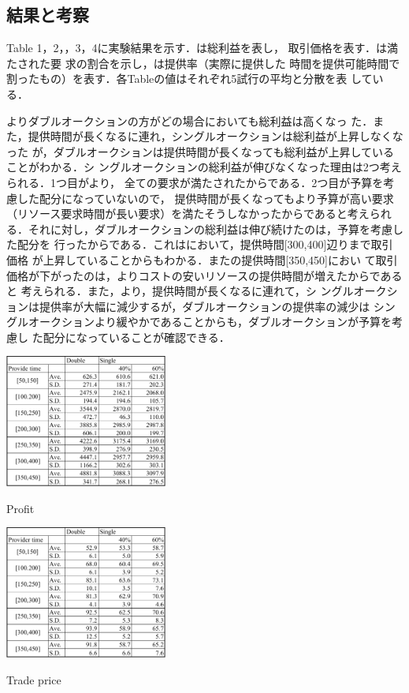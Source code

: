 \documentclass{ujarticle}
\begin{document}
\subsection{結果と考察}
Table 1，2，，3，4に実験結果を示す．は総利益を表し，
取引価格を表す．は満たされた要
求の割合を示し，は提供率（実際に提供した
時間を提供可能時間で割ったもの）を表す．各Tableの値はそれぞれ5試行の平均と分散を表
している．\par
{}よりダブルオークションの方がどの場合においても総利益は高くなっ
た．また，提供時間が長くなるに連れ，シングルオークションは総利益が上昇しなくなった
が，ダブルオークションは提供時間が長くなっても総利益が上昇していることがわかる．シ
ングルオークションの総利益が伸びなくなった理由は2つ考えられる．1つ目がより，
全ての要求が満たされたからである．2つ目が予算を考慮した配分になっていないので，
提供時間が長くなってもより予算が高い要求（リソース要求時間が長い要求）を満たそうしなかったからであると考えられ
る．それに対し，ダブルオークションの総利益は伸び続けたのは，予算を考慮した配分を
行ったからである．これはにおいて，提供時間[300,400]辺りまで取引価格
が上昇していることからもわかる．またの提供時間[350,450]におい
て取引価格が下がったのは，よりコストの安いリソースの提供時間が増えたからであると
考えられる．また，より，提供時間が長くなるに連れて，シ
ングルオークションは提供率が大幅に減少するが，ダブルオークションの提供率の減少は
シングルオークションより緩やかであることからも，ダブルオークションが予算を考慮し
た配分になっていることが確認できる．
\begin{table}[H]
  \centering
  \includegraphics[width=0.4\textwidth]{profit.pdf} 
  \caption{Profit}
  \label{tab:profit}
\end{table}

\begin{table}[H]
  \centering
  \includegraphics[width=0.4\textwidth]{trade.pdf} 
  \caption{Trade price}
  \label{tab:trade}
\end{table}
\end{document}
